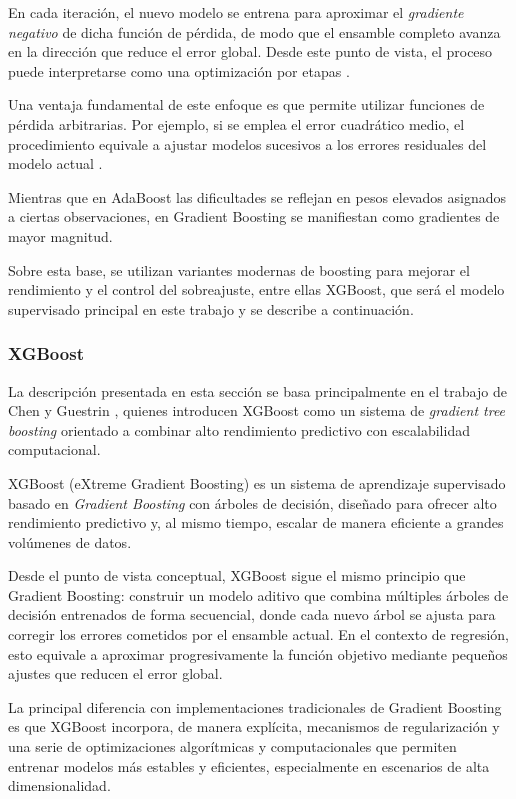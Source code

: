 En cada iteración, el nuevo modelo se entrena para aproximar el
\textit{gradiente negativo} de dicha función de pérdida, de modo que el ensamble
completo avanza en la dirección que reduce el error global. Desde este punto de
vista, el proceso puede interpretarse como una optimización por etapas
\cite{friedman2001greedy,natekin2013gradient}.

Una ventaja fundamental de este enfoque es que permite utilizar funciones de
pérdida arbitrarias. Por ejemplo, si se emplea el error cuadrático medio, el
procedimiento equivale a ajustar modelos sucesivos a los errores residuales del
modelo actual \cite{friedman2001greedy,natekin2013gradient}.


Mientras que en AdaBoost las dificultades se reflejan en pesos elevados asignados
a ciertas observaciones, en Gradient Boosting se manifiestan como gradientes de
mayor magnitud.

Sobre esta base, se utilizan variantes modernas de boosting para mejorar
el rendimiento y el control del sobreajuste, entre ellas XGBoost, que será
el modelo supervisado principal en este trabajo y se describe a continuación.

\subsubsection{XGBoost}

La descripción presentada en esta sección se basa principalmente en el trabajo
de Chen y Guestrin \cite{chen2016xgboost}, quienes introducen XGBoost como un sistema de
\textit{gradient tree boosting} orientado a combinar alto rendimiento
predictivo con escalabilidad computacional.

XGBoost (eXtreme Gradient Boosting) es un sistema de aprendizaje supervisado
basado en \textit{Gradient Boosting} con árboles de decisión, diseñado para
ofrecer alto rendimiento predictivo y, al mismo tiempo, escalar de manera
eficiente a grandes volúmenes de datos.  

Desde el punto de vista conceptual, XGBoost sigue el mismo principio que
Gradient Boosting: construir un modelo aditivo que combina múltiples árboles
de decisión entrenados de forma secuencial, donde cada nuevo árbol se ajusta
para corregir los errores cometidos por el ensamble actual. En el contexto de
regresión, esto equivale a aproximar progresivamente la función objetivo
mediante pequeños ajustes que reducen el error global.

La principal diferencia con implementaciones tradicionales de Gradient
Boosting es que XGBoost incorpora, de manera explícita, mecanismos de
regularización y una serie de optimizaciones algorítmicas y computacionales
que permiten entrenar modelos más estables y eficientes, especialmente en
escenarios de alta dimensionalidad.

